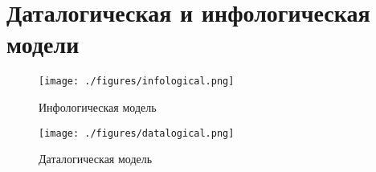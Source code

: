 \section{Даталогическая и инфологическая модели}

\begin{figure}[h!]
  \centering
  \texttt{[image: ./figures/infological.png]}
  \caption{Инфологическая модель}
\end{figure}

\begin{figure}[h!]
  \centering
  \texttt{[image: ./figures/datalogical.png]}
  \caption{Даталогическая модель}
\end{figure}
\clearpage


